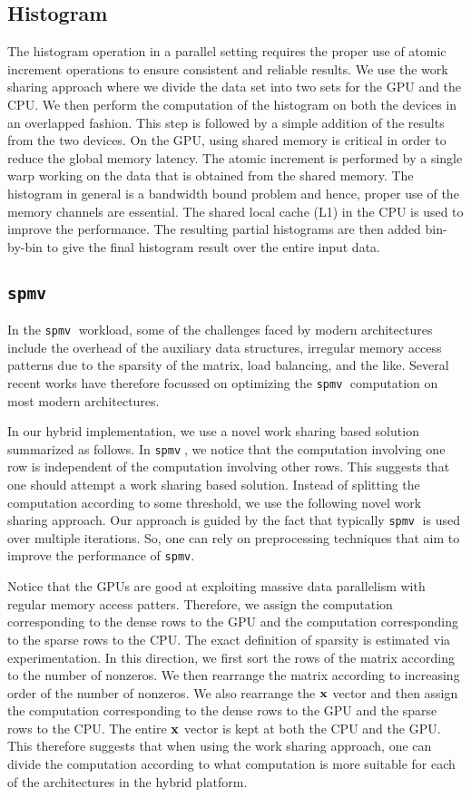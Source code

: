 \documentclass[11pt]{article}
\newcommand{\spmv} {{\tt spmv}}
\begin{document}
\subsection{Histogram}
The histogram operation in a parallel setting requires the
proper use of atomic increment operations to ensure consistent
and reliable results. We use the work sharing approach
where we divide the data set into two sets for the GPU and
the CPU. We then perform the computation of the histogram on both
the devices in an overlapped fashion. This step is followed by a simple
addition of the results from the two devices. On the GPU, using shared memory
is critical in order to reduce the global memory latency. The atomic
increment is performed by a single warp working on the data that is
obtained from the shared memory. The histogram in general is a bandwidth
bound problem and hence, proper use of the memory channels are essential.
The shared local cache (L1) in the CPU is used to improve the performance.
The resulting partial  histograms are then
added bin-by-bin to give the final histogram result over the
entire input data.



\subsection{\spmv}
In the \spmv $\;$ workload, some of the challenges faced by modern architectures
include the overhead of the auxiliary data structures, irregular memory
access patterns due to the sparsity of the matrix, load balancing, and the
like. Several recent works \cite{BG09} have therefore focussed on optimizing
the \spmv$\;$ computation on most modern architectures. 

In our hybrid implementation, we use a novel work sharing based solution 
summarized as follows. 
In \spmv $\;$, we notice that the computation involving one row is independent of
the computation involving other rows. This suggests that one should attempt a
work sharing based solution. Instead of splitting the computation according to
some threshold, we use  the following novel work sharing approach. Our
approach is guided by the fact that typically \spmv $\;$ is used over multiple
iterations. So, one can rely on preprocessing techniques that aim to improve
the performance of \spmv. 

Notice that the GPUs are good at exploiting massive data parallelism
with regular memory access patters. Therefore, we assign the
computation corresponding to the dense rows to the GPU and the computation
corresponding to the sparse rows to the CPU. The exact definition of
sparsity is estimated via experimentation. In this direction, we first sort
the rows of the matrix according to the number of nonzeros. We then rearrange
the matrix according to increasing order of the number of nonzeros. We also
rearrange the ${\bf x}$ vector and then assign the computation corresponding to the
dense rows to the GPU and the sparse rows to the CPU. The entire ${\bf x}$ vector is
kept at both the CPU and the GPU. This therefore suggests that
when using the work sharing approach, one can divide the computation according to what
computation is more suitable for each of the architectures in the hybrid
platform.
\end{document}
